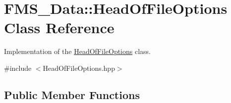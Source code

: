\hypertarget{classFMS__Data_1_1HeadOfFileOptions}{
\section{FMS\_\-Data::HeadOfFileOptions Class Reference}
\label{classFMS__Data_1_1HeadOfFileOptions}
}


Implementation of the \hyperlink{classFMS__Data_1_1HeadOfFileOptions}{HeadOfFileOptions} class.  




{\ttfamily \#include $<$HeadOfFileOptions.hpp$>$}

\subsection*{Public Member Functions}
